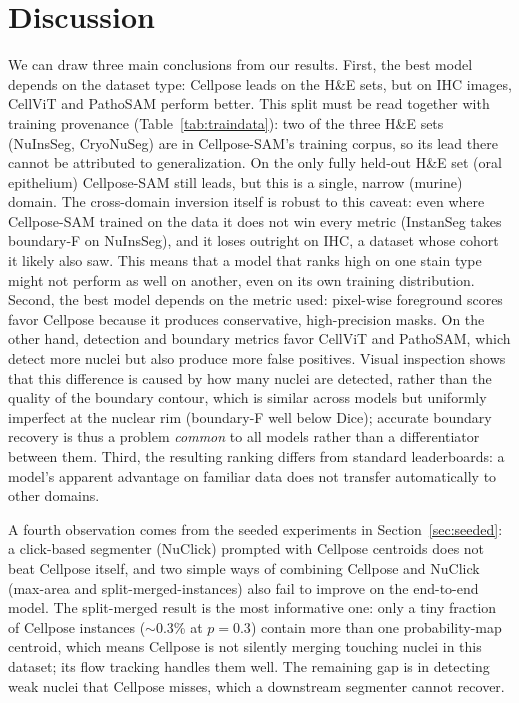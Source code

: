 \documentclass[10pt,conference]{IEEEtran}
\begin{document}
\section{Discussion}
\label{sec:discussion}
We can draw three main conclusions from our results. First, the best model depends on the dataset
type: Cellpose leads on the H\&E sets, but on IHC images, CellViT and PathoSAM
perform better. This split must be read together with training provenance
(Table~\ref{tab:traindata}): two of the three H\&E sets (NuInsSeg, CryoNuSeg) are in
Cellpose-SAM's training corpus, so its lead there cannot be attributed to generalization.
On the only fully held-out H\&E set (oral epithelium) Cellpose-SAM still leads, but this is a
single, narrow (murine) domain. The cross-domain inversion itself is robust to this caveat:
even where Cellpose-SAM trained on the data it does not win every metric (InstanSeg takes
boundary-F on NuInsSeg), and it loses outright on IHC, a dataset whose cohort it likely also
saw. This means that a model that ranks high on one stain type might not perform
as well on another, even on its own training distribution. Second, the best model depends on the metric used: pixel-wise foreground
scores favor Cellpose because it produces conservative, high-precision masks. On the other hand,
detection and boundary metrics favor CellViT and PathoSAM, which detect more nuclei but also produce
more false positives. Visual inspection shows that this difference is caused by how many nuclei are
detected, rather than the quality of the boundary contour, which is similar across models but
uniformly imperfect at the nuclear rim (boundary-F well below Dice); accurate boundary recovery is
thus a problem \emph{common} to all models rather than a differentiator between them. Third, the resulting ranking differs
from standard leaderboards: a model's apparent advantage on familiar data does not transfer
automatically to other domains.

A fourth observation comes from the seeded experiments in
Section~\ref{sec:seeded}: a click-based segmenter (NuClick) prompted with Cellpose centroids does
not beat Cellpose itself, and two simple ways of combining Cellpose and NuClick (max-area and
split-merged-instances) also fail to improve on the end-to-end model. The split-merged result is
the most informative one: only a tiny fraction of Cellpose instances ($\sim$0.3\% at $p{=}0.3$)
contain more than one probability-map centroid, which means Cellpose is not silently merging
touching nuclei in this dataset; its flow tracking handles them well. The remaining gap is in
detecting weak nuclei that Cellpose misses, which a downstream segmenter cannot recover.
\end{document}
